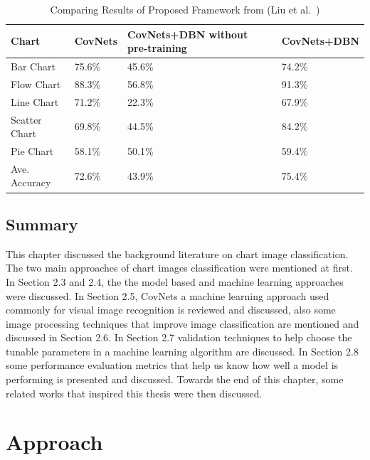 \documentclass[12pt, a4paper,oneside]{report}
\begin{document}
\begin{table}[h]
	\centering {} \small
	\begin{tabular}{|p{3cm}|p{3cm}|p{3cm}|p{3cm}|}
		
		\hline
		Chart & CovNets&CovNets+DBN without pre-training & CovNets+DBN \\ \hline
				
		Bar Chart & 75.6\% & 45.6\% & 74.2\% \\ \hline
		Flow Chart & 88.3\%  & 56.8\% & 91.3\%  \\ \hline
		Line Chart  & 71.2\%  & 22.3\% & 67.9\% \\ \hline
	
		Scatter Chart & 69.8\% & 44.5\% & 84.2\% \\ \hline
		Pie Chart & 58.1\%  & 50.1\% & 59.4\%    \\ \hline
		Ave. Accuracy & 72.6\%  & 43.9\% & 75.4\% \\ \hline
		
	\end{tabular}
	\caption {Comparing Results of Proposed Framework from (Liu et al.~\cite{liu2015chart}) }	
	\label{table:deep}
	
\end{table}


\section{Summary}
This chapter discussed the background literature on chart image classification. The two main approaches of chart images classification were mentioned at first. In Section 2.3 and 2.4, the the model based and machine learning approaches were discussed. In Section 2.5, CovNets a machine learning approach used commonly for visual image recognition is reviewed and discussed, also some image processing techniques that improve image classification are mentioned and discussed in Section 2.6.  In Section 2.7 validation techniques to help choose the tunable parameters in a machine learning algorithm are discussed. In Section 2.8 some performance evaluation metrics that help us know how well a model is performing is presented and discussed. Towards the end of this chapter, some related works that inspired this thesis  were then discussed.


\chapter{Approach}
\end{document}
